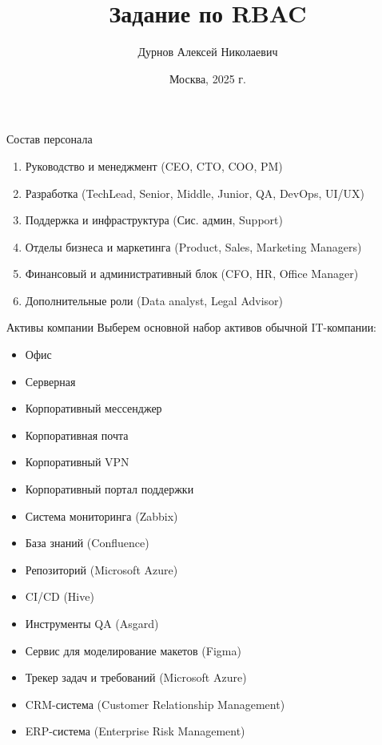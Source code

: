 \documentclass[10pt]{beamer}
\title[]{Задание по RBAC}
\author{Дурнов Алексей Николаевич}
\institute[МФТИ]{
    Московский физико-технический институт\\
    Физтех-школа радиотехники и компьютерных технологий\\
}
\date{Москва, 2025 г.}
\begin{document}
\begin{frame}
    \titlepage
    \thispagestyle{empty}
\end{frame}

\begin{frame}{Состав персонала}
    \begin{enumerate}
        \item Руководство и менеджмент (CEO, CTO, COO, PM)
        \item Разработка (TechLead, Senior, Middle, Junior, QA, DevOps, UI/UX)
        \item Поддержка и инфраструктура (Сис. админ, Support)
        \item Отделы бизнеса и маркетинга (Product, Sales, Marketing Managers)
        \item Финансовый и административный блок (CFO, HR, Office Manager)
        \item Дополнительные роли (Data analyst, Legal Advisor)
    \end{enumerate}
\end{frame}

\begin{frame}{Активы компании}
    Выберем основной набор активов обычной IT-компании:
    \begin{itemize}
            \item Офис
            \item Серверная
            \item Корпоративный мессенджер
            \item Корпоративная почта
            \item Корпоративный VPN
            \item Корпоративный портал поддержки
            \item Система мониторинга (Zabbix)
            \item База знаний (Confluence)
            \item Репозиторий (Microsoft Azure)
            \item CI/CD (Hive)
            \item Инструменты QA (Asgard)
            \item Сервис для моделирование макетов (Figma)
            \item Трекер задач и требований (Microsoft Azure)
            \item CRM-система (Customer Relationship Management)
            \item ERP-система (Enterprise Risk Management)
        \end{itemize}
\end{frame}
\end{document}
